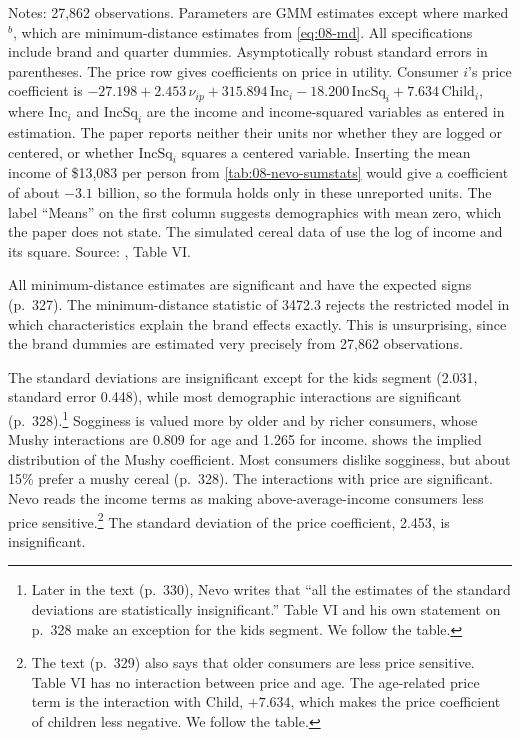 \begin{table}[htbp]
\smallskip
\begin{minipage}{0.92\linewidth}
\footnotesize Notes: 27,862 observations. Parameters are GMM estimates except where marked $^{b}$, which are
minimum-distance estimates from \eqref{eq:08-md}. All specifications include brand and quarter dummies.
Asymptotically robust standard errors in parentheses. The price row gives coefficients on price in utility.
Consumer $i$'s price coefficient is $-27.198 + 2.453\,\nu_{ip} + 315.894\,\mathrm{Inc}_i - 18.200\,
\mathrm{IncSq}_i + 7.634\,\mathrm{Child}_i$, where $\mathrm{Inc}_i$ and $\mathrm{IncSq}_i$ are the income and
income-squared variables as entered in estimation. The paper reports neither their units nor whether they are
logged or centered, or whether $\mathrm{IncSq}_i$ squares a centered variable. Inserting the mean income of
\$13,083 per person from \cref{tab:08-nevo-sumstats} would give a coefficient of about $-3.1$ billion, so the
formula holds only in these unreported units. The label ``Means'' on the first column suggests demographics
with mean zero, which the paper does not state. The simulated cereal data of \citet{Nevo2000a} use the log of
income and its square. Source: \citet{Nevo2001}, Table VI.
\end{minipage}
\end{table}

 All minimum-distance estimates are significant and have the expected signs (p.~327).
The minimum-distance statistic of 3472.3 rejects the restricted model in which characteristics explain the
brand effects exactly. This is unsurprising, since the brand dummies are estimated very precisely from 27,862
observations.

 The standard deviations are insignificant except for the kids segment (2.031, standard
error 0.448), while most demographic interactions are significant (p.~328).\footnote{Later in the text (p.~330),
Nevo writes that ``all the estimates of the standard deviations are statistically insignificant.'' Table VI and
his own statement on p.~328 make an exception for the kids segment. We follow the table.} Sogginess is valued more by older and by
richer consumers, whose Mushy interactions are 0.809 for age and 1.265 for income. 
shows the implied distribution of the Mushy coefficient. Most consumers dislike sogginess, but about 15\% prefer
a mushy cereal (p.~328). The interactions with price are significant. Nevo reads the income terms as making
above-average-income consumers less price sensitive.\footnote{The text (p.~329) also says that older consumers
are less price sensitive. Table VI has no interaction between price and age. The age-related price term is the
interaction with Child, $+7.634$, which makes the price coefficient of children less negative. We follow the
table.} The standard deviation of the price coefficient, 2.453, is insignificant.

